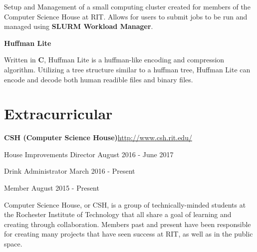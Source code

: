 \documentclass[margin,line]{resume}
\newcommand{\rurl}[1]{\hfill {\footnotesize \url{#1}}}
\begin{document}
\begin{resume}
\begin{asparablank}
		\small Setup and Management of a small computing cluster created for members of the Computer Science House at RIT. Allows for users to submit jobs to be run and managed using \textbf{SLURM Workload Manager}.
		\\
		\item {\bf Huffman Lite}

		\small Written in \textbf{C}, Huffman Lite is a huffman-like encoding and compression algorithm. Utilizing a tree structure similar to a huffman tree, Huffman Lite can encode and decode both human readible files and binary files.
		\normalsize
	\end{asparablank}
    
\section{\mysidestyle Extracurricular}
	\begin{asparablank}
		\item {\bf CSH ({\small Computer Science House})}\rurl{http://www.csh.rit.edu/}
		\small	\item House Improvements Director \hfill August 2016 - June 2017
        \small  \item Drink Administrator \hfill March 2016 - Present
        \small  \item Member \hfill August 2015 - Present
        \linebreak
        
        \small Computer Science House, or CSH, is a group of technically-minded students at the Rochester Institute of Technology that all share a goal of learning and creating through collaboration. Members past and present have been responsible for creating many projects that have seen success at RIT, as well as in the public space.
	\end{asparablank}
    

\end{resume}
\end{document}

